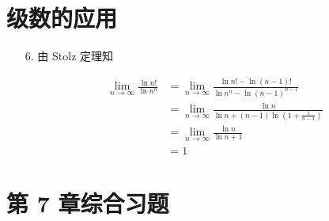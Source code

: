 \documentclass[oneside]{ctexbook} %
\begin{document}
\section{级数的应用}

\begin{enumerate}
    \item[6.]
    由 Stolz 定理知
    
    $$
    \begin{aligned}
        \lim_{n \to \infty} \frac{\ln n!}{\ln n^n} &= \lim_{n \to \infty} \frac{\ln n! - \ln (n-1)!}{\ln n^n - \ln (n-1)^{n-1}} \\
        &= \lim_{n \to \infty} \frac{\ln n}{\ln n + (n-1) \ln\left( 1 + \frac 1 {n-1} \right)} \\
        &= \lim_{n \to \infty} \frac{\ln n}{\ln n + 1} \\
        &= 1
    \end{aligned}
    $$
\end{enumerate}

\section*{第 7 章综合习题}
\end{document}
